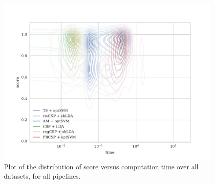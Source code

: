 \begin{figure}
  \centering
  \includegraphics[width=\textwidth]{Figures/time_score.pdf}
  \caption{Plot of the distribution of score versus computation time over all
    datasets, for all pipelines. }
  \label{fig:time}
\end{figure}

